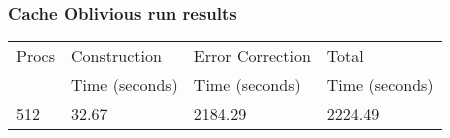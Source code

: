 \documentclass[integrals, nointegrals, article, 12pt, a4paper]{article}
\begin{document}
\subsubsection{Cache Oblivious run results}
\label{sec-2-4-3}

\begin{center}
\begin{tabular}{llll}
\hline
Procs & Construction & Error Correction & Total\\
 & Time (seconds) & Time (seconds) & Time (seconds)\\
\hline
512 & 32.67 & 2184.29 & 2224.49\\
\hline
\end{tabular}
\end{center}
\end{document}
